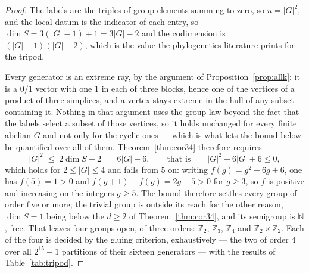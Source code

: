 \documentclass[11pt,a4paper]{article}
\theoremstyle{definition}
\newcommand{\ZZ}{\mathbb{Z}}
\newcommand{\NN}{\mathbb{N}}
\begin{document}
\begin{proof}
The labels are the triples of group elements summing to zero, so $n=|G|^2$, and the local datum is
the indicator of each entry, so $\dim S=3(|G|-1)+1=3|G|-2$ and the codimension is $(|G|-1)(|G|-2)$,
which is the value the phylogenetics literature prints for the tripod.

Every generator is an extreme ray, by the argument of Proposition~\ref{prop:allk}: it is a $0/1$
vector with one $1$ in each of three blocks, hence one of the vertices of a product of three
simplices, and a vertex stays extreme in the hull of any subset containing it. Nothing in that
argument uses the group law beyond the fact that the labels select a subset of those vertices,
so it holds unchanged for every finite abelian $G$ and not only for the cyclic ones ---
which is what lets the bound below be quantified over all of them. Theorem~\ref{thm:cor34}
therefore requires
\begin{equation}\label{eq:tripodbound}
\boxed{\;|G|^2\;\le\;2\dim S-2\;=\;6|G|-6,\qquad\text{that is}\qquad |G|^2-6|G|+6\le0,\;}
\end{equation}
which holds for $2\le|G|\le4$ and fails from $5$ on: writing $f(g)=g^2-6g+6$, one has $f(5)=1>0$ and
$f(g+1)-f(g)=2g-5>0$ for $g\ge3$, so $f$ is positive and increasing on the integers $g\ge5$.
The bound therefore settles every group of
order five or more; the trivial group is outside its reach for the other reason, $\dim S=1$ being
below the $d\ge2$ of Theorem~\ref{thm:cor34}, and its semigroup is $\NN$, free. That leaves four
groups open, of three orders: $\ZZ_2$, $\ZZ_3$, $\ZZ_4$ and
$\ZZ_2\times\ZZ_2$. Each of the four is decided by the gluing criterion, exhaustively --- the two of order $4$ over all
$2^{15}-1$ partitions of their sixteen generators --- with the results of Table~\ref{tab:tripod}.
\end{proof}
\end{document}
